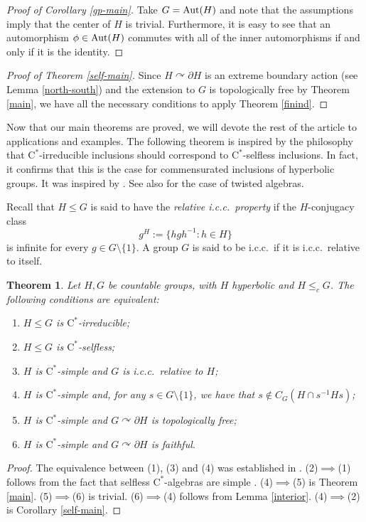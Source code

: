 \documentclass[11pt]{article}
\newtheorem{thm}{Theorem}[section]
\theoremstyle{definition}
\theoremstyle{remark}
\numberwithin{equation}{section}
\numberwithin{equation}{section}
\newcommand{\Cs}{\ensuremath{\mathrm{C}^\ast}}
\numberwithin{equation}{section}
\begin{document}
\begin{proof}[Proof of Corollary \ref{gp-main}]
    Take $G={\rm Aut}(H)$ and note that the assumptions imply that the center of $H$ is trivial. Furthermore, it is easy to see that an automorphism $\phi\in{\rm Aut}(H)$ commutes with all of the inner automorphisms if and only if it is the identity.
\end{proof}


\begin{proof}[Proof of Theorem \ref{self-main}]
    Since $H\curvearrowright\partial H$ is an extreme boundary action (see Lemma \ref{north-south}) and the extension to $G$ is topologically free by Theorem \ref{main}, we have all the necessary conditions to apply Theorem \ref{finind}.
\end{proof}

Now that our main theorems are proved, we will devote the rest of the article to applications and examples. The following theorem is inspired by the philosophy that \Cs-irreducible inclusions should correspond to \Cs-selfless inclusions. In fact, it confirms that this is the case for commensurated inclusions of hyperbolic groups. It was inspired by \cite[Theorem 3.5]{LiSc23}. See also \cite{BeOm23} for the case of twisted algebras.

Recall that $H\leq G$ is said to have the \emph{relative i.c.c.\ property} if the $H$-conjugacy class
$$
g^H:=\{hgh^{-1}:h\in H\}
$$
is infinite for every $g\in G\setminus\{1\}$. A group $G$ is said to be i.c.c.\ if it is i.c.c.\ relative to itself.

\begin{thm}\label{char}
Let $H,G$ be countable groups, with $H$ hyperbolic and $H\leq_cG$. The following conditions are equivalent:

\begin{enumerate}
\item $ H \leq G $ is \Cs-irreducible;
\item $ H \leq G $ is \Cs-selfless;
\item $ H $ is \Cs-simple and $ G $ is i.c.c.\ relative to $ H $;
\item $ H $ is \Cs-simple and, for any $s\in G \setminus\{1\}$, we have that $s\notin {C}_ G ( H \cap s^{-1}Hs)$;
\item $ H $ is \Cs-simple and $ G \curvearrowright\partial H$ is topologically free;
\item $ H $ is \Cs-simple and $ G \curvearrowright\partial H$ is faithful.
\end{enumerate}

\end{thm}
\begin{proof}
The equivalence between (1), (3) and (4) was established in \cite[Theorem 3.5]{LiSc23}.
(2)$\implies$(1) follows from the fact that selfless \Cs-algebras are simple \cite{Ro25}.
(4)$\implies$(5) is Theorem \ref{main}.
(5)$\implies$(6) is trivial.
(6)$\implies$(4) follows from Lemma \ref{interior}.
(4)$\implies$(2) is Corollary \ref{self-main}.
\end{proof}
\end{document}

